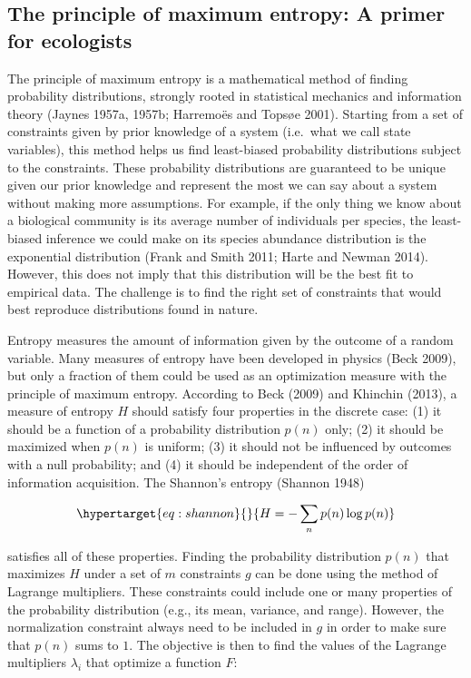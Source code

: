 \documentclass[10pt,oneside]{article}
\begin{document}
\hypertarget{the-principle-of-maximum-entropy-a-primer-for-ecologists}{%
\subsection{The principle of maximum entropy: A primer for
ecologists}\label{the-principle-of-maximum-entropy-a-primer-for-ecologists}}

The principle of maximum entropy is a mathematical method of finding
probability distributions, strongly rooted in statistical mechanics and
information theory (Jaynes 1957a, 1957b; Harremoës and Topsøe 2001).
Starting from a set of constraints given by prior knowledge of a system
(i.e.~what we call state variables), this method helps us find
least-biased probability distributions subject to the constraints. These
probability distributions are guaranteed to be unique given our prior
knowledge and represent the most we can say about a system without
making more assumptions. For example, if the only thing we know about a
biological community is its average number of individuals per species,
the least-biased inference we could make on its species abundance
distribution is the exponential distribution (Frank and Smith 2011;
Harte and Newman 2014). However, this does not imply that this
distribution will be the best fit to empirical data. The challenge is to
find the right set of constraints that would best reproduce
distributions found in nature.

Entropy measures the amount of information given by the outcome of a
random variable. Many measures of entropy have been developed in physics
(Beck 2009), but only a fraction of them could be used as an
optimization measure with the principle of maximum entropy. According to
Beck (2009) and Khinchin (2013), a measure of entropy \(H\) should
satisfy four properties in the discrete case: (1) it should be a
function of a probability distribution \(p(n)\) only; (2) it should be
maximized when \(p(n)\) is uniform; (3) it should not be influenced by
outcomes with a null probability; and (4) it should be independent of
the order of information acquisition. The Shannon's entropy (Shannon
1948)

\begin{equation}\protect\hypertarget{eq:shannon}{}{H = -\sum_{n} p(n) \log p(n)}\label{eq:shannon}\end{equation}

satisfies all of these properties. Finding the probability distribution
\(p(n)\) that maximizes \(H\) under a set of \(m\) constraints \(g\) can
be done using the method of Lagrange multipliers. These constraints
could include one or many properties of the probability distribution
(e.g., its mean, variance, and range). However, the normalization
constraint always need to be included in \(g\) in order to make sure
that \(p(n)\) sums to \(1\). The objective is then to find the values of
the Lagrange multipliers \(\lambda_i\) that optimize a function \(F\):
\end{document}
